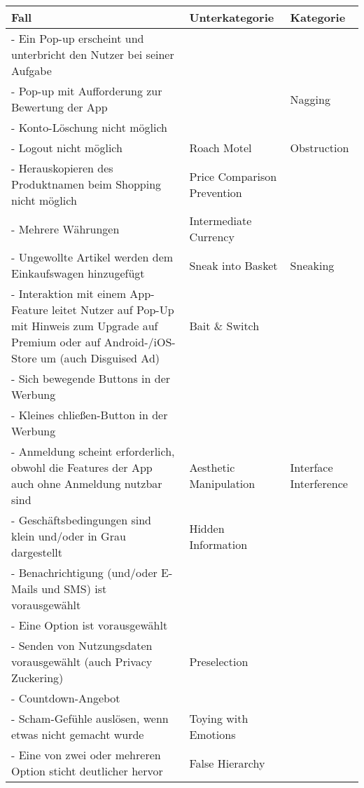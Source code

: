 \documentclass[a4paper]{article}
\begin{document}
\begin{table}
    \begin{tabular}{|l|l|l|}
    \hline
        Fall & Unterkategorie & Kategorie \\ \hline
        - Ein Pop-up erscheint und unterbricht den Nutzer bei seiner Aufgabe &  &  \\ \hline
        - Pop-up mit Aufforderung zur Bewertung der App &  & Nagging \\ \hline
        - Konto-Löschung nicht möglich &  &  \\ \hline
        - Logout nicht möglich & Roach Motel & Obstruction \\ \hline
        - Herauskopieren des Produktnamen beim Shopping nicht möglich & Price Comparison Prevention &  \\ \hline
        - Mehrere Währungen & Intermediate Currency &  \\ \hline
        - Ungewollte Artikel werden dem Einkaufswagen hinzugefügt & Sneak into Basket & Sneaking \\ \hline
        - Interaktion mit einem App-Feature leitet Nutzer auf Pop-Up mit Hinweis zum Upgrade auf Premium oder auf Android-/iOS-Store um (auch Disguised Ad) & Bait \& Switch &  \\ \hline
        - Sich bewegende Buttons in der Werbung &  &  \\ \hline
        - Kleines chließen-Button in der Werbung &  &  \\ \hline
        - Anmeldung scheint erforderlich, obwohl die Features der App auch ohne Anmeldung nutzbar sind & Aesthetic Manipulation & Interface Interference \\ \hline
        - Geschäftsbedingungen sind klein und/oder in Grau dargestellt & Hidden Information &  \\ \hline
        - Benachrichtigung (und/oder E-Mails und SMS) ist vorausgewählt &  &  \\ \hline
        - Eine Option ist vorausgewählt &  &  \\ \hline
        - Senden von Nutzungsdaten vorausgewählt (auch Privacy Zuckering) & Preselection &  \\ \hline
        - Countdown-Angebot &  &  \\ \hline
        - Scham-Gefühle auslösen, wenn etwas nicht gemacht wurde & Toying with Emotions &  \\ \hline
        - Eine von zwei oder mehreren Option sticht deutlicher hervor & False Hierarchy &  \\ \hline

\end{tabular}
\end{table}
\end{document}
